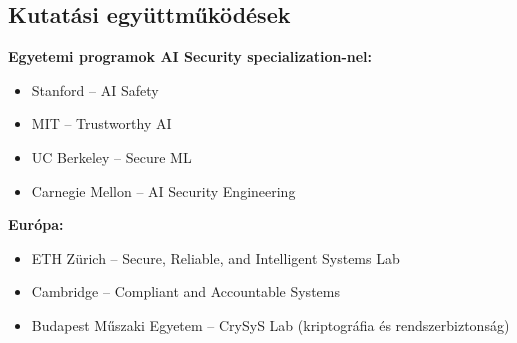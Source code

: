 \documentclass{../templates/magazine}
\begin{document}
\subsection{Kutatási együttműködések}

\textbf{Egyetemi programok AI Security specialization-nel:}
\begin{itemize}
    \item Stanford -- AI Safety
    \item MIT -- Trustworthy AI
    \item UC Berkeley -- Secure ML
    \item Carnegie Mellon -- AI Security Engineering
\end{itemize}

\textbf{Európa:}
\begin{itemize}
    \item ETH Zürich -- Secure, Reliable, and Intelligent Systems Lab
    \item Cambridge -- Compliant and Accountable Systems
    \item Budapest Műszaki Egyetem -- CrySyS Lab (kriptográfia és rendszerbiztonság)
\end{itemize}

\newpage

\thispagestyle{empty}

\vspace*{5cm}
\end{document}
